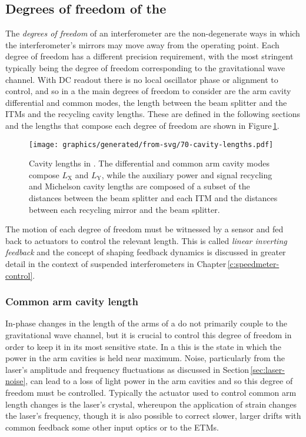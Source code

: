 \subsection{\label{sec:dofs-of-drfpmi}Degrees of freedom of the \DRFPMI{}}
The \emph{degrees of freedom} of an interferometer are the non-degenerate ways in which the interferometer's mirrors may move away from the operating point. Each degree of freedom has a different precision requirement, with the most stringent typically being the degree of freedom corresponding to the gravitational wave channel. With \gls{DC} readout there is no local oscillator phase or alignment to control, and so in a \DRFPMI{} the main degrees of freedom to consider are the arm cavity differential and common modes, the length between the beam splitter and the \glspl{ITM} and the recycling cavity lengths. These are defined in the following sections and the lengths that compose each degree of freedom are shown in Figure\,\ref{fig:et-lf-cavity-lengths}.

\begin{figure}
  \centering
  \texttt{[image: graphics/generated/from-svg/70-cavity-lengths.pdf]}
  \caption[Cavity lengths in \ETLF{}]{\label{fig:et-lf-cavity-lengths}Cavity lengths in \ETLF{}. The differential and common arm cavity modes compose $L_{\text{X}}$ and $L_{\text{Y}}$, while the auxiliary power and signal recycling and Michelson cavity lengths are composed of a subset of the distances between the beam splitter and each \gls{ITM} and the distances between each recycling mirror and the beam splitter.}
\end{figure}

The motion of each degree of freedom must be witnessed by a sensor and fed back to actuators to control the relevant length. This is called \emph{linear inverting feedback} and the concept of shaping feedback dynamics is discussed in greater detail in the context of suspended interferometers in Chapter\,\ref{c:speedmeter-control}.

\subsubsection{Common arm cavity length}
In-phase changes in the length of the arms of a \MI{} do not primarily couple to the gravitational wave channel, but it is crucial to control this degree of freedom in order to keep it in its most sensitive state. In a \DRFPMI{} this is the state in which the power in the arm cavities is held near maximum. Noise, particularly from the laser's amplitude and frequency fluctuations as discussed in Section\,\ref{sec:laser-noise}, can lead to a loss of light power in the arm cavities and so this degree of freedom must be controlled. Typically the actuator used to control common arm length changes is the laser's crystal, whereupon the application of strain changes the laser's frequency, though it is also possible to correct slower, larger drifts with common feedback some other input optics or to the \glspl{ETM}.

